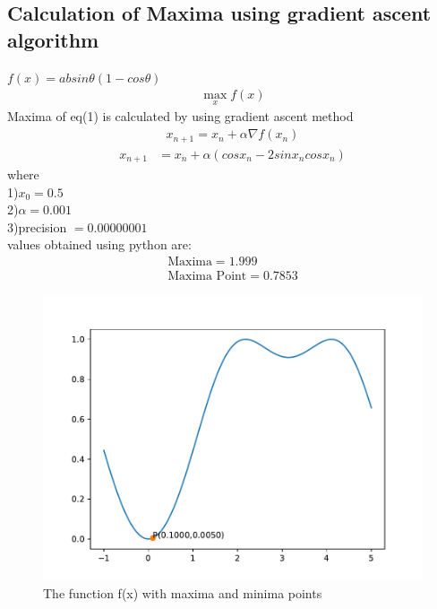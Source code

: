 \documentclass[10pt,twocolumn]{article}
\providecommand{\brak}[1]{\ensuremath{\left(#1\right)}}
\begin{document}
\subsection{Calculation of Maxima using gradient ascent algorithm}
$f(x) = absin\theta(1-cos\theta)$\\
\begin{align}
\max_{x} f(x)
\end{align} 
Maxima of eq(1) is calculated by using gradient ascent method
\begin{align}
x_{n+1} = x_n + \alpha \nabla f(x_n) 
\end{align}
\begin{align}
x_{n+1} &= x_n + \alpha \brak{cosx_n-2sinx_ncosx_n}
\end{align}
where \\
1)$x_0=0.5$ \\
2)$\alpha=0.001$ \\
3)precision $= 0.00000001$ \\
values obtained using python are:
    \begin{align}
        \boxed{\text{Maxima} = 1.999 }\\
        \boxed{\text{Maxima Point} = 0.7853}
    \end{align}
    
\begin{figure}[h!]
\includegraphics[scale=0.55]{opt2.pdf}
\caption{The function f(x) with maxima and minima points}
\end{figure}        
\end{document}
